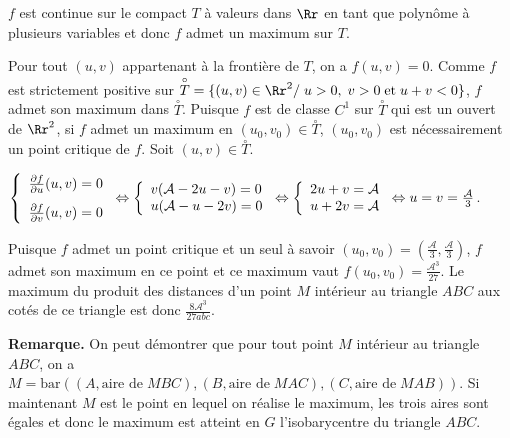 {{$f$ est continue sur le compact $T$ à valeurs dans $\Rr$ en tant que polynôme à plusieurs variables et donc $f$ admet un maximum sur $T$.

Pour tout $(u,v)$ appartenant à la frontière de $T$, on a $f(u,v)=0$. Comme $f$ est strictement positive sur $\overset{\circ}{T}=\{(u,v)\in\Rr^2/\;u>0,\;v>0\;\text{et}\;u+v<0\}$, $f$ admet son maximum dans $\overset{\circ}{T}$. Puisque $f$ est de classe $C^1$ sur $\overset{\circ}{T}$ qui est un ouvert de $\Rr^2$, si $f$ admet un maximum en $(u_0,v_0)\in\overset{\circ}{T}$, $(u_0,v_0)$ est nécessairement un point critique de $f$. Soit $(u,v)\in\overset{\circ}{T}$.

\begin{center}
$\left\{
\begin{array}{l}
 \frac{\partial f}{\partial u}(u,v)=0\\
\rule{0mm}{6mm} \frac{\partial f}{\partial v}(u,v)=0
\end{array}
\right.\Leftrightarrow\left\{
\begin{array}{l}
v(\mathcal{A}-2u-v)=0\\
u(\mathcal{A}-u-2v)=0
\end{array}
\right.\Leftrightarrow\left\{
\begin{array}{l}
2u+v=\mathcal{A}\\
u+2v=\mathcal{A}
\end{array}
\right.\Leftrightarrow u=v= \frac{\mathcal{A}}{3}$.
\end{center}

Puisque $f$ admet un point critique et un seul à savoir $(u_0,v_0)=\left( \frac{\mathcal{A}}{3}, \frac{\mathcal{A}}{3}\right)$, $f$ admet son maximum en ce point et ce maximum vaut $f(u_0,v_0)= \frac{\mathcal{A}^3}{27}$. Le maximum du produit des distances d'un point $M$ intérieur au triangle $ABC$ aux cotés de ce triangle est donc $ \frac{8\mathcal{A}^3}{27abc}$.

\textbf{Remarque.} On peut démontrer que pour tout point $M$ intérieur au triangle $ABC$, on a $M=\text{bar}\left((A,\text{aire de}\;MBC),(B,\text{aire de}\;MAC),(C,\text{aire de}\;MAB)\right)$. Si maintenant $M$ est le point en lequel on réalise le maximum, les trois aires sont égales et donc le maximum est atteint en $G$ l'isobarycentre du triangle $ABC$.
}
}
